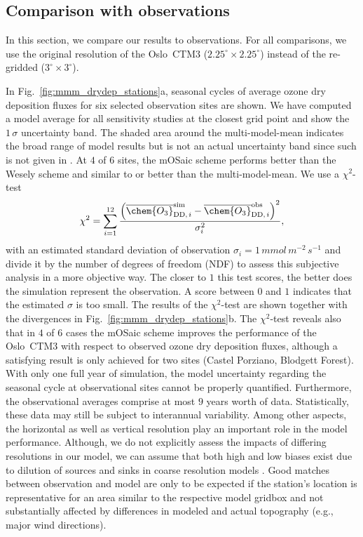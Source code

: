 \documentclass[gmd, manuscript]{copernicus}
\begin{document}
\subsection{Comparison with observations}
\label{subsec:obs}
In this section, we compare our results to observations. For all comparisons, we use the original resolution of the Oslo~CTM3 ($2.25^\circ\times 2.25^\circ$) instead of the re-gridded ($3^\circ\times 3^\circ$).

In Fig.~\ref{fig:mmm_drydep_stations}a, seasonal cycles of average ozone dry deposition fluxes for six selected observation sites are shown. We have computed a model average for all sensitivity studies at the closest grid point and show the $1\,\sigma$ uncertainty band. The shaded area around the multi-model-mean indicates the broad range of model results but is not an actual uncertainty band since such is not given in \citet{ACP:Hardacre2015}. At $4$ of $6$ sites, the mOSaic scheme performs better than the Wesely scheme and similar to or better than the multi-model-mean. We use a $\chi^2$-test
\begin{equation}
  \chi^2 = \sum_{i=1}^{12}\frac{\left(\overline{\chem{O_3}}_{\text{DD,\,}i}^\text{sim}-\overline{\chem{O_3}}_{\text{DD,\,}i}^\text{obs}\right)^2}{\sigma_i^2},
\end{equation}
with an estimated standard deviation of observation $\sigma_i=1\,\unit{mmol\,m^{-2}\,s^{-1}}$ and divide it by the number of degrees of freedom (NDF) to assess this subjective analysis in a more objective way. The closer to $1$ this test scores, the better does the simulation represent the observation. A score between $0$ and $1$ indicates that the estimated $\sigma$ is too small. The results of the $\chi^2$-test are shown together with the divergences in Fig.~\ref{fig:mmm_drydep_stations}b. The $\chi^2$-test reveals also that in $4$ of $6$ cases the mOSaic scheme improves the performance of the Oslo~CTM3 with respect to observed ozone dry deposition fluxes, although a satisfying result is only achieved for two sites (Castel Porziano, Blodgett Forest).
With only one full year of simulation, the model uncertainty regarding the seasonal cycle at observational sites cannot be properly quantified. Furthermore, the observational averages comprise at most $9$ years worth of data. Statistically, these data may still be subject to interannual variability. Among other aspects, the horizontal as well as vertical resolution play an important role in the model performance. Although, we do not explicitly assess the impacts of differing resolutions in our model, we can assume that both high and low biases exist due to dilution of sources and sinks in coarse resolution models \citep{AE:Schaap2015}. Good matches between observation and model are only to be expected if the station's location is representative for an area similar to the respective model gridbox and not substantially affected by differences in modeled and actual topography (e.g., major wind directions).
\end{document}
